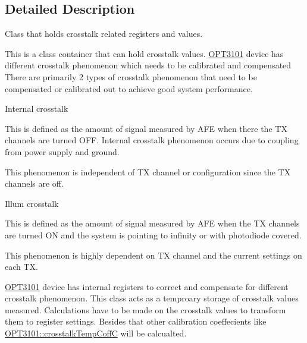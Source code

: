 \subsection{Detailed Description}
Class that holds crosstalk related registers and values. 

This is a class container that can hold crosstalk values. \mbox{\hyperlink{namespace_o_p_t3101}{O\+P\+T3101}} device has different crosstalk phenomenon which needs to be calibrated and compensated~\newline
 There are primarily 2 types of crosstalk phenomenon that need to be compensated or calibrated out to achieve good system performance. ~\newline

\begin{DoxyEnumerate}
\item Internal crosstalk
\begin{DoxyEnumerate}
\item This is defined as the amount of signal measured by A\+FE when there the TX channels are turned O\+FF. Internal crosstalk phenomenon occurs due to coupling from power supply and ground.~\newline

\item This phenomenon is independent of TX channel or configuration since the TX channels are off.
\end{DoxyEnumerate}
\item Illum crosstalk
\begin{DoxyEnumerate}
\item This is defined as the amount of signal measured by A\+FE when the TX channels are turned ON and the system is pointing to infinity or with photodiode covered.
\item This phenomenon is highly dependent on TX channel and the current settings on each TX.
\end{DoxyEnumerate}
\end{DoxyEnumerate}

\mbox{\hyperlink{namespace_o_p_t3101}{O\+P\+T3101}} device has internal registers to correct and compensate for different crosstalk phenomenon. This class acts as a temproary storage of crosstalk values measured. Calculations have to be made on the crosstalk values to transform them to register settings. Besides that other calibration coeffecients like \mbox{\hyperlink{class_o_p_t3101_1_1crosstalk_temp_coff_c}{O\+P\+T3101\+::crosstalk\+Temp\+CoffC}} will be calcualted. 

